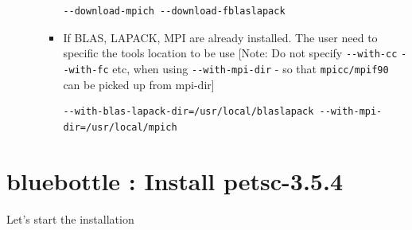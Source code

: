 \documentclass{article}
\begin{document}
\begin{enumerate}
\begin{enumerate}
\begin{itemize}
\begin{verbatim}
--download-mpich --download-fblaslapack
\end{verbatim}
\normalsize
\item If BLAS, LAPACK, MPI are already installed. The user need to specific the tools location to be use [Note: Do not specify \verb+--with-cc+ \verb+--with-fc+ etc,
when using \verb+--with-mpi-dir+ - so that \verb+mpicc/mpif90+ can be picked up from mpi-dir]
\scriptsize
\begin{verbatim}
--with-blas-lapack-dir=/usr/local/blaslapack --with-mpi-dir=/usr/local/mpich
\end{verbatim}
\normalsize
\end{itemize}
\end{enumerate}
\end{enumerate}

\section{bluebottle : Install petsc-3.5.4} 
Let's start the installation
\end{document}
